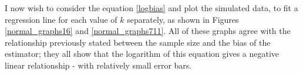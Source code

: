 \documentclass[12pt]{report}
\begin{document}
I now wish to consider the equation \ref{logbias} and plot the simulated data, to fit a regression line for each value of $k$ separately, as shown in Figures \ref{normal_graphs16} and \ref{normal_graphs711}. All of these graphs agree with the relationship previously stated between the sample size and the bias of the estimator; they all show that the logarithm of this equation gives a negative linear relationship - with relatively small error bars.

\begin{figure}
\    
\end{figure}
\end{document}
